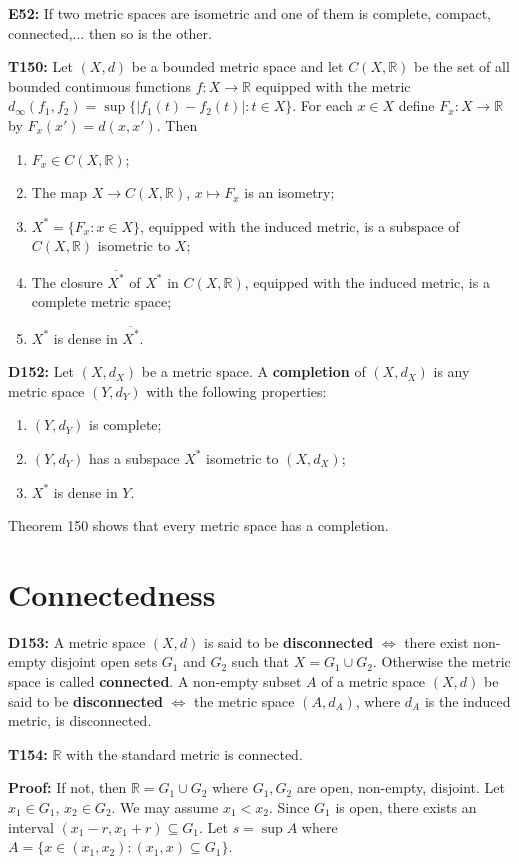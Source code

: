 \documentclass[twocolumn,10pt]{article}
\begin{document}
\textbf{E52:} If two metric spaces are isometric and one of them is complete, compact, connected,... then so is the other.

\textbf{T150:} Let $(X,d)$ be a bounded metric space and let $C(X,\mathbb{R})$ be the set of all bounded continuous functions $f:X\to\mathbb{R}$ equipped with the metric $d_{\infty}(f_1,f_2)=\sup\{|f_1(t)-f_2(t)|:t\in X\}$. For each $x\in X$ define $F_x:X\to\mathbb{R}$ by $F_x(x')=d(x,x')$. Then
\begin{enumerate}
    \item $F_x\in C(X,\mathbb{R})$;
    \item The map $X\to C(X,\mathbb{R})$, $x\mapsto F_x$ is an isometry;
    \item $X^*=\{F_x:x\in X\}$, equipped with the induced metric, is a subspace of $C(X,\mathbb{R})$ isometric to $X$;
    \item The closure $\overline{X^*}$ of $X^*$ in $C(X,\mathbb{R})$, equipped with the induced metric, is a complete metric space;
    \item $X^*$ is dense in $\overline{X^*}$.
\end{enumerate}
\textbf{D152:} Let $(X,d_X)$ be a metric space. A \textbf{completion} of $(X,d_X)$ is any metric space $(Y,d_Y)$ with the following properties:
\begin{enumerate}
    \item $(Y,d_Y)$ is complete;
    \item $(Y,d_Y)$ has a subspace $X^*$ isometric to $(X,d_X)$;
    \item $X^*$ is dense in $Y$.
\end{enumerate}
Theorem 150 shows that every metric space has a completion.


\section{Connectedness}

\textbf{D153:} A metric space $(X,d)$ is said to be \textbf{disconnected} $\Leftrightarrow$ there exist non-empty disjoint open sets $G_1$ and $G_2$ such that $X=G_1\cup G_2$. Otherwise the metric space is called \textbf{connected}. A non-empty subset $A$ of a metric space $(X,d)$ be said to be \textbf{disconnected} $\Leftrightarrow$ the metric space $(A,d_A)$, where $d_A$ is the induced metric, is disconnected.

\textbf{T154:} $\mathbb{R}$ with the standard metric is connected.

\color{red}
\textbf{Proof:} If not, then $\mathbb{R}=G_1\cup G_2$ where $G_1,G_2$ are open, non-empty, disjoint. Let $x_1\in G_1$, $x_2\in G_2$. We may assume $x_1<x_2$. Since $G_1$ is open, there exists an interval $(x_1-r,x_1+r)\subseteq G_1$. Let $s=\sup A$ where $A=\{x\in(x_1,x_2):(x_1,x)\subseteq G_1\}$.
\end{document}

